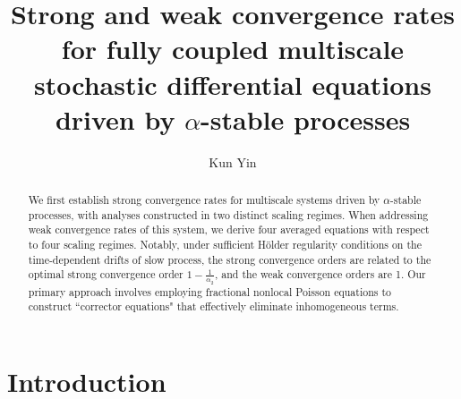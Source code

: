 \documentclass[11pt,reqno]{amsart}
\numberwithin{equation}{section}
\begin{document}
	
\title[convergence rates for slow-fast system]{Strong and weak convergence rates for fully coupled multiscale stochastic differential equations driven by $\alpha$-stable processes}
\author{Kun Yin}

\address{Department of Mathematics, Shanghai Jiao Tong University, 200240 Shanghai, PR China.}





\begin{abstract}
	We first establish strong convergence rates for multiscale systems driven by $\alpha$-stable processes, with analyses constructed in two distinct scaling regimes. When addressing weak convergence rates of this system, we derive four averaged equations with respect to four scaling regimes. Notably, under sufficient H\"{o}lder regularity conditions on  the time-dependent drifts of slow process, the strong convergence orders are related to the optimal strong convergence order $1-\frac{1}{\alpha_{2}}$, and the weak convergence orders are 1. Our primary approach involves employing fractional nonlocal Poisson equations to construct ``corrector equations" that effectively eliminate inhomogeneous terms.
\end{abstract}
\maketitle




\section{Introduction}
\end{document}
